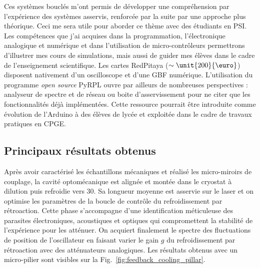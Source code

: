 \documentclass[12pt,a4paper]{article}
\newenvironment{mep}{%
\addcontentsline{ldf}{figure}{0}%
\begin{mep_env}
\small}
{\end{mep_env}}
\begin{document}
\begin{mep}
Ces systèmes bouclés m'ont permis de développer une compréhension par l'expérience des systèmes asservis, renforcée par la suite par une approche plus théorique.
Ceci me sera utile pour aborder ce thème avec des étudiants en PSI.
Les compétences que j'ai acquises dans la programmation, l'électronique analogique et numérique et dans l'utilisation de micro-contrôleurs permettrons d'illustrer mes cours de simulations, mais aussi de guider mes élèves dans le cadre de l'enseignement scientifique.
Les cartes RedPitaya ($\sim\unit{200}{\text{\euro}}$) disposent nativement d'un oscilloscope et d'une GBF numérique.
L'utilisation du programme \textit{open source} PyRPL ouvre par ailleurs de nombreuses perspectives :  analyseur de spectre et de réseau ou boite d'asservissement pour ne citer que les fonctionnalités déjà implémentées.
Cette ressource pourrait être introduite comme évolution de l'Arduino à des élèves de lycée et exploitée dans le cadre de travaux pratiques en CPGE.
\end{mep}

\subsection{Principaux résultats obtenus}
\label{sec:results}

Après avoir caractérisé les échantillons mécaniques et réalisé les micro-miroirs de couplage, la cavité optomécanique est alignée et montée dans le cryostat à dilution puis refroidie vers \unit{30}{\milli\kelvin}.
Sa longueur moyenne est asservie sur le laser et on optimise les paramètres de la boucle de contrôle du refroidissement par rétroaction.
Cette phase s'accompagne d'une identification méticuleuse des parasites électroniques, acoustiques et optiques qui compromettent la stabilité de l'expérience pour les atténuer.
On acquiert finalement le spectre des fluctuations de position de l'oscillateur en faisant varier le gain $g$ du refroidissement par rétroaction avec des atténuateurs analogiques.
Les résultats obtenus avec un micro-pilier sont visibles sur la Fig.~\ref{fig:feedback_cooling_pillar}.
\end{document}
